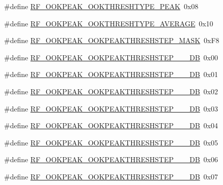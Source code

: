\begin{DoxyCompactItemize}
\item 
\#define \mbox{\hyperlink{sx1276_regs-_fsk_8h_a20ec7775c45b4a1cc90fe08e498d5bf9}{R\+F\+\_\+\+O\+O\+K\+P\+E\+A\+K\+\_\+\+O\+O\+K\+T\+H\+R\+E\+S\+H\+T\+Y\+P\+E\+\_\+\+P\+E\+AK}}~0x08
\item 
\#define \mbox{\hyperlink{sx1276_regs-_fsk_8h_a5ff6a1e29aba2e560b9ecedad7e31edd}{R\+F\+\_\+\+O\+O\+K\+P\+E\+A\+K\+\_\+\+O\+O\+K\+T\+H\+R\+E\+S\+H\+T\+Y\+P\+E\+\_\+\+A\+V\+E\+R\+A\+GE}}~0x10
\item 
\#define \mbox{\hyperlink{sx1276_regs-_fsk_8h_a524369fe14789f919e9d15908c500e08}{R\+F\+\_\+\+O\+O\+K\+P\+E\+A\+K\+\_\+\+O\+O\+K\+P\+E\+A\+K\+T\+H\+R\+E\+S\+H\+S\+T\+E\+P\+\_\+\+M\+A\+SK}}~0x\+F8
\item 
\#define \mbox{\hyperlink{sx1276_regs-_fsk_8h_aeb7f9969c7c16737c6d44fc3c9e50dfa}{R\+F\+\_\+\+O\+O\+K\+P\+E\+A\+K\+\_\+\+O\+O\+K\+P\+E\+A\+K\+T\+H\+R\+E\+S\+H\+S\+T\+E\+P\+\_\+\_\+\_\+\+DB}}~0x00
\item 
\#define \mbox{\hyperlink{sx1276_regs-_fsk_8h_a502a4cebfd6bf36312360df00b987d5e}{R\+F\+\_\+\+O\+O\+K\+P\+E\+A\+K\+\_\+\+O\+O\+K\+P\+E\+A\+K\+T\+H\+R\+E\+S\+H\+S\+T\+E\+P\+\_\+\_\+\_\+\+DB}}~0x01
\item 
\#define \mbox{\hyperlink{sx1276_regs-_fsk_8h_a3c73c078a2b02c4d7c96a7645cd59dc5}{R\+F\+\_\+\+O\+O\+K\+P\+E\+A\+K\+\_\+\+O\+O\+K\+P\+E\+A\+K\+T\+H\+R\+E\+S\+H\+S\+T\+E\+P\+\_\+\_\+\_\+\+DB}}~0x02
\item 
\#define \mbox{\hyperlink{sx1276_regs-_fsk_8h_ac659aab479d8f4719a2e5e04bed3b9bf}{R\+F\+\_\+\+O\+O\+K\+P\+E\+A\+K\+\_\+\+O\+O\+K\+P\+E\+A\+K\+T\+H\+R\+E\+S\+H\+S\+T\+E\+P\+\_\+\_\+\_\+\+DB}}~0x03
\item 
\#define \mbox{\hyperlink{sx1276_regs-_fsk_8h_a38a4fc95f2ee8beda4d0e385613f1bfb}{R\+F\+\_\+\+O\+O\+K\+P\+E\+A\+K\+\_\+\+O\+O\+K\+P\+E\+A\+K\+T\+H\+R\+E\+S\+H\+S\+T\+E\+P\+\_\+\_\+\_\+\+DB}}~0x04
\item 
\#define \mbox{\hyperlink{sx1276_regs-_fsk_8h_aec641cef999dd2d468a584ea612e2c03}{R\+F\+\_\+\+O\+O\+K\+P\+E\+A\+K\+\_\+\+O\+O\+K\+P\+E\+A\+K\+T\+H\+R\+E\+S\+H\+S\+T\+E\+P\+\_\+\_\+\_\+\+DB}}~0x05
\item 
\#define \mbox{\hyperlink{sx1276_regs-_fsk_8h_ae8518d15001ad5791fbeb05923019dec}{R\+F\+\_\+\+O\+O\+K\+P\+E\+A\+K\+\_\+\+O\+O\+K\+P\+E\+A\+K\+T\+H\+R\+E\+S\+H\+S\+T\+E\+P\+\_\+\_\+\_\+\+DB}}~0x06
\item 
\#define \mbox{\hyperlink{sx1276_regs-_fsk_8h_a085b555fd2c09aa73357dc6336eda7ac}{R\+F\+\_\+\+O\+O\+K\+P\+E\+A\+K\+\_\+\+O\+O\+K\+P\+E\+A\+K\+T\+H\+R\+E\+S\+H\+S\+T\+E\+P\+\_\+\_\+\_\+\+DB}}~0x07

\end{DoxyCompactItemize}

